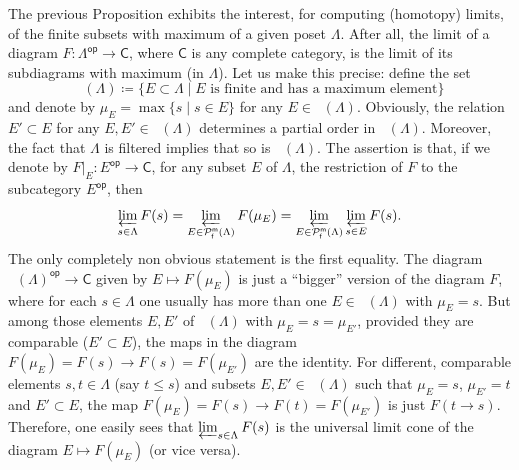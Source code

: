 \documentclass[reqno,11pt]{amsart}
\theoremstyle{plain}
\theoremstyle{remark}
\theoremstyle{definition}
\numberwithin{equation}{thm}
\newcommand{\CP}{\mathcal{P}}
\newcommand{\SC}{\mathsf{C}}
\newcommand{\op}{\mathsf{op}}
\DeclareMathOperator{\pfinmax}{\CP_{\mathsf{f}}^{\mathsf{m}}}
\begin{document}
	The previous Proposition exhibits the interest, for computing (homotopy) limits, of the finite subsets with maximum of a given poset $\Lambda$. After all, the limit of a diagram $F \colon \Lambda^\op \to \SC$, where $\SC$ is any complete category, is the limit of its subdiagrams with maximum (in $\Lambda$). Let us make this precise: define the set 
	\[
		\pfinmax(\Lambda) \coloneqq \{E \subset \Lambda \mid E \text{ is finite and has a maximum element}\}
	\] 
	and denote by $\mu_E = \max\{s \mid s \in E\}$ for any $E \in \pfinmax(\Lambda)$. Obviously, the relation $E' \subset E$ for any $E, E' \in \pfinmax(\Lambda)$ determines a partial order in $\pfinmax(\Lambda)$. Moreover, the fact that $\Lambda$ is filtered implies that so is $\pfinmax(\Lambda)$.%
	The assertion is that, if we denote by $F\vert_E \colon E^\op \to \SC$, for any subset $E$ of $\Lambda$, the restriction of $F$ to the subcategory $E^\op$, then
	\begin{equation}\label{limit-finite-subsystems-maximum}
		\varprojlim_{s \in \Lambda} F(s) = \varprojlim_{E \in \pfinmax(\Lambda)} F(\mu_E) = \varprojlim_{E \in \pfinmax(\Lambda)} \varprojlim_{s \in E} F(s).
	\end{equation}
	The only completely non obvious statement is the first equality. The diagram $\pfinmax(\Lambda)^\op \to \SC$ given by $E \mapsto F(\mu_E)$ is just a ``bigger'' version of the diagram $F$, where for each $s \in \Lambda$ one usually has more than one $E \in \pfinmax(\Lambda)$ with $\mu_E=s$. But among those elements $E, E'$ of $\pfinmax(\Lambda)$ with $\mu_E = s = \mu_{E'}$, provided they are comparable ($E' \subset E$), the maps in the diagram $F(\mu_E) = F(s) \to F(s) = F(\mu_{E'})$ are the identity. For different, comparable elements $s, t \in \Lambda$ (say $t \leq s$) and subsets $E, E' \in \pfinmax(\Lambda)$ such that $\mu_E= s$, $\mu_{E'}=t$ and $E' \subset E$, the map  $F(\mu_E) = F(s) \to F(t) = F(\mu_{E'})$ is just $F(t \to s)$. Therefore, one easily sees that $\varprojlim_{s \in \Lambda} F(s)$ is the universal limit cone of the diagram $E \mapsto F(\mu_E)$ (or vice versa).
	
\end{document}
